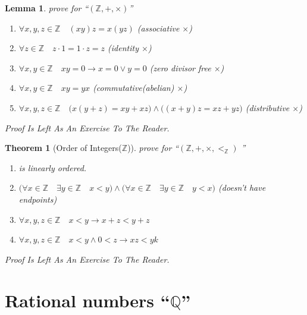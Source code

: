 \documentclass[10pt,a4paper]{book}
\newtheorem{theorem}{Theorem}[section]
\newtheorem{lemma}{Lemma}[section]
\begin{document}
\begin{lemma}prove for  ``$ (\mathbb{Z} , + , \times )  $''
    \begin{enumerate}
        \setlength{\itemsep}{0pt} %
        \item       $\forall x ,y ,z  \in \mathbb{Z} \quad (x   y )  z  = x  (y   z )  $ (associative $\times$)
        \item       $\forall z \in \mathbb{Z} \quad z \cdot 1 = 1 \cdot  z = z$ (identity  $\times$)
        \item       $\forall x ,y   \in \mathbb{Z} \quad   x y = 0   \to  x = 0  \lor  y = 0 $ (zero divisor free $\times$)
        \item       $\forall x ,y  \in \mathbb{Z} \quad x   y  = y   x $  (commutative(abelian)  $\times$)
        \item       $\forall x ,y ,z  \in \mathbb{Z} \quad \Big(x   (y  + z ) = x   y  +  x   z  \Big)
                  \land     \Big((x  + y )  z  = x   z  +  y   z  \Big)  $ (distributive $\times$)
    \end{enumerate}
    Proof Is Left As An Exercise To The Reader.
\end{lemma}

\begin{theorem}
    [Order of Integers($\mathbb{Z}$)] prove for  ``$ (\mathbb{Z} ,+ , \times , <_\mathbb{Z}  )  $ ''
    \begin{enumerate}
        \setlength{\itemsep}{0pt} %
        \item       is linearly ordered.
        \item       $ \Big( \forall x \in \mathbb{Z} \quad   \exists y \in \mathbb{Z} \quad  x < y \Big)
                  \land \Big( \forall x \in \mathbb{Z} \quad   \exists y \in \mathbb{Z} \quad   y < x \Big)  $ (doesn't have endpoints)
        \item       $\forall x ,y ,z \in \mathbb{Z} \quad x  < y  \to x  + z < y  + z  $
        \item       $\forall x ,y ,z \in \mathbb{Z} \quad x  < y  \land 0 < z \to x  z < y  k  $
    \end{enumerate}
    Proof Is Left As An Exercise To The Reader.
\end{theorem}

\section{Rational numbers ``$\mathbb{Q}$''}
\end{document}
